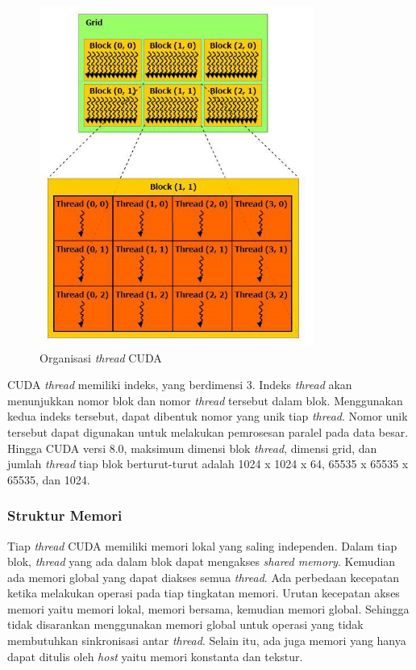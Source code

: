       \begin{figure}[H]
        \centering
        \includegraphics[width=0.8\textwidth]{resources/cudathread.jpg}
        \caption[Organisasi \emph{thread} CUDA]{Organisasi \emph{thread} CUDA \parencite{cuda}}
      \end{figure}

      CUDA \emph{thread} memiliki indeks, yang berdimensi 3. Indeks \emph{thread} akan menunjukkan nomor blok dan nomor \emph{thread} tersebut dalam blok. Menggunakan kedua indeks tersebut, dapat dibentuk nomor yang unik tiap \emph{thread}. Nomor unik tersebut dapat digunakan untuk melakukan pemrosesan paralel pada data besar. Hingga CUDA versi 8.0, maksimum dimensi blok \emph{thread}, dimensi grid, dan jumlah \emph{thread} tiap blok berturut-turut adalah 1024 x 1024 x 64, 65535 x 65535 x 65535, dan 1024.

    \subsubsection{Struktur Memori}

      Tiap \emph{thread} CUDA memiliki memori lokal yang saling independen. Dalam tiap blok, \emph{thread} yang ada dalam blok dapat mengakses \emph{shared memory}. Kemudian ada memori global yang dapat diakses semua \emph{thread}. Ada perbedaan kecepatan ketika melakukan operasi pada tiap tingkatan memori. Urutan kecepatan akses memori yaitu memori lokal, memori bersama, kemudian memori global. Sehingga tidak disarankan menggunakan memori global untuk operasi yang tidak membutuhkan sinkronisasi antar \emph{thread}. Selain itu, ada juga memori yang hanya dapat ditulis oleh \emph{host} yaitu memori konstanta dan tekstur.

